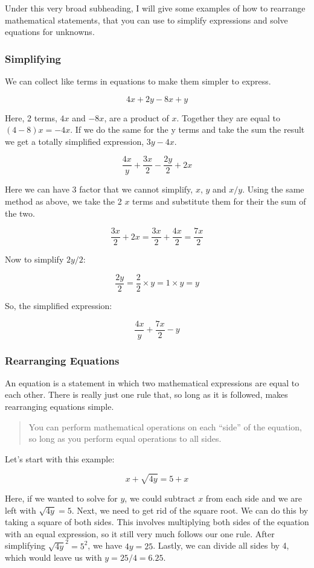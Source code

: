 Under this very broad subheading, I will give some examples of how to rearrange mathematical statements, that you can use to simplify expressions and solve equations for unknowns.

\hypertarget{simplifying}{%
\subsubsection{Simplifying}\label{simplifying}}

We can collect like terms in equations to make them simpler to express.

\[4x+2y-8x+y\]

Here, 2 terms, \(4x\) and \(-8x\), are a product of \(x\). Together they are equal to \((4-8)x=-4x\). If we do the same for the y terms and take the sum the result we get a totally simplified expression, \(3y-4x\).

\[\frac{4x}{y}+\frac{3x}{2}-\frac{2y}{2}+2x\]

Here we can have 3 factor that we cannot simplify, \(x\), \(y\) and \(x/y\). Using the same method as above, we take the 2 \(x\) terms and substitute them for their the sum of the two.

\[\frac{3x}{2}+2x=\frac{3x}{2}+\frac{4x}{2}=\frac{7x}{2}\]

Now to simplify \(2y/2\):

\[\frac{2y}{2}=\frac{2}{2}\times y=1 \times y = y\]

So, the simplified expression:

\[\frac{4x}{y}+\frac{7x}{2}-y\]

\hypertarget{rearranging-equations}{%
\subsubsection{Rearranging Equations}\label{rearranging-equations}}

An equation is a statement in which two mathematical expressions are equal to each other. There is really just one rule that, so long as it is followed, makes rearranging equations simple.

\begin{quote}
You can perform mathematical operations on each ``side'' of the equation, so long as you perform equal operations to all sides.
\end{quote}

Let's start with this example:

\[x+\sqrt{4y}=5+x\]

Here, if we wanted to solve for \(y\), we could subtract \(x\) from each side and we are left with \(\sqrt{4y}=5\). Next, we need to get rid of the square root. We can do this by taking a square of both sides. This involves multiplying both sides of the equation with an equal expression, so it still very much follows our one rule. After simplifying \(\sqrt{4y}^2=5^2\), we have \(4y=25\). Lastly, we can divide all sides by 4, which would leave us with \(y=25/4=6.25\).

